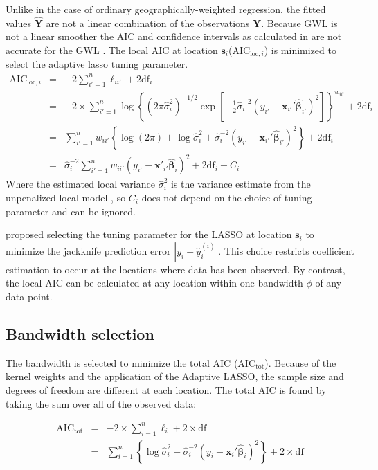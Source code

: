 \documentclass[authoryear, review, 11pt]{elsarticle}
\begin{document}
	Unlike in the case of ordinary geographically-weighted regression, the fitted values $\hat{\bm{Y}}$ are not a linear combination of the observations $\bm{Y}$. Because GWL is not a linear smoother the AIC and confidence intervals as calculated in \cite{Fotheringham:2002} are not accurate for the GWL \citep{Zou:2006}. The local AIC at location $\bm{s}_i$($\mbox{AIC}_{\text{loc}, i}$) is minimized to select the adaptive lasso tuning parameter.
	\begin{eqnarray}
		\mbox{AIC}_{\text{loc}, i} &=& -2 \sum_{i'=1}^n \ell_{ii'}  + 2 \mbox{df}_i\\
		&=& -2 \times \sum_{i'=1}^n \log \left\{ \left(2 \pi \hat{\sigma}_i^2\right)^{-1/2} \exp \left[-\frac{1}{2} \hat{\sigma}_i^{-2} \left(y_{i'} - \bm{x}_{i'}' \hat{\bm{\beta}}_{i'} \right)^2\right] \right\}^{w_{ii'}} + 2\mbox{df}_i\\
		&=& \sum_{i'=1}^n w_{ii'} \left\{ \log \left(2 \pi \right) + \log \hat{\sigma}_i^2 + \hat{\sigma}_i^{-2} \left(y_{i'} - \bm{x}_{i'}' \hat{\bm{\beta}}_{i'} \right)^2 \right\} + 2\mbox{df}_i \\
		&=& \hat{\sigma}_i^{-2} \sum_{i'=1}^n w_{ii'} \left( y_{i'} - \bm{x}'_{i'} \hat{\bm{\beta}}_i \right)^2 + 2 \mbox{df}_i + C_i
	\end{eqnarray}	
	Where the estimated local variance $\hat{\sigma}_i^2$ is the variance estimate from the unpenalized local model \citep{Zou:2007}, so $C_i$ does not depend on the choice of tuning parameter and can be ignored.
	
	\cite{Wheeler:2009} proposed selecting the tuning parameter for the LASSO at location $\bm{s}_i$ to minimize the jackknife prediction error $|y_i - \hat{y}_i^{(i)}|$. This choice restricts coefficient estimation to occur at the locations where data has been observed. By contrast, the local AIC can be calculated at any location within one bandwidth $\phi$ of any data point. 
	 
	\subsection{Bandwidth selection}
	The bandwidth is selected to minimize the total AIC ($\mbox{AIC}_{\mbox{tot}}$). Because of the kernel weights and the application of the Adaptive LASSO, the sample size and degrees of freedom are different at each location. The total AIC is found by taking the sum over all of the observed data:	
		
	\begin{eqnarray}
		\mbox{AIC}_{\mbox{tot}} &=& -2 \times \sum_{i=1}^n \ell_i + 2 \times \mbox{df}\\
		&=& \sum_{i=1}^n \left\{ \log \hat{\sigma}_i^2 + \hat{\sigma}_i^{-2} \left(y_i - \bm{x}_i' \hat{\bm{\beta}}_i \right)^2 \right\} + 2 \times \mbox{df}\label{eq:total-AIC1}
	\end{eqnarray}	
	
\end{document}
